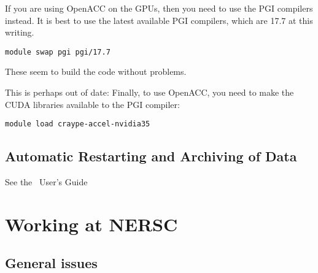 If you are using OpenACC on the GPUs, then you need to use the PGI
compilers instead.  It is best to use the latest available PGI
compilers, which are 17.7 at this writing.  
\begin{verbatim}
module swap pgi pgi/17.7
\end{verbatim}

These seem to build the code without problems.

This is perhaps out of date:
Finally, to use OpenACC, you need to make the CUDA libraries available to the PGI compiler:
\begin{verbatim}
module load craype-accel-nvidia35
\end{verbatim}

\subsection{Automatic Restarting and Archiving of Data}

See the \maestro\ User's Guide


\section{Working at NERSC}

\subsection{General issues}





